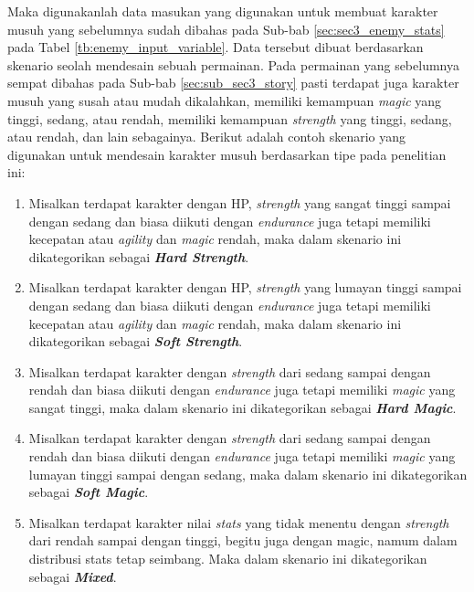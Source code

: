 Maka digunakanlah data masukan yang digunakan untuk membuat karakter musuh yang sebelumnya sudah dibahas pada Sub-bab \ref{sec:sec3_enemy_stats} pada Tabel \ref{tb:enemy_input_variable}. Data tersebut dibuat berdasarkan skenario seolah mendesain sebuah permainan. Pada permainan yang sebelumnya sempat dibahas pada Sub-bab \ref{sec:sub_sec3_story} pasti terdapat juga karakter musuh yang susah atau mudah dikalahkan, memiliki kemampuan \textit{magic} yang tinggi, sedang, atau rendah, memiliki kemampuan \textit{strength} yang tinggi, sedang, atau rendah, dan lain sebagainya. Berikut adalah contoh skenario yang digunakan untuk mendesain karakter musuh berdasarkan tipe pada penelitian ini:

\begin{enumerate}[label=\arabic*).]
	\item Misalkan terdapat karakter dengan HP, \textit{strength} yang sangat tinggi sampai dengan sedang dan biasa diikuti dengan \textit{endurance} juga tetapi memiliki kecepatan atau \textit{agility} dan \textit{magic} rendah, maka dalam skenario ini dikategorikan sebagai \textbf{\textit{Hard Strength}}. 
	
	\item Misalkan terdapat karakter dengan HP, \textit{strength} yang lumayan tinggi sampai dengan sedang dan biasa diikuti dengan \textit{endurance} juga tetapi memiliki kecepatan atau \textit{agility} dan \textit{magic} rendah, maka dalam skenario ini dikategorikan sebagai \textbf{\textit{Soft Strength}}.
	
	\item Misalkan terdapat karakter dengan \textit{strength} dari sedang sampai dengan rendah dan biasa diikuti dengan \textit{endurance} juga tetapi memiliki \textit{magic} yang sangat tinggi, maka dalam skenario ini dikategorikan sebagai \textbf{\textit{Hard Magic}}.
	
	\item Misalkan terdapat karakter dengan \textit{strength} dari sedang sampai dengan rendah dan biasa diikuti dengan \textit{endurance} juga tetapi memiliki \textit{magic} yang lumayan tinggi sampai dengan sedang, maka dalam skenario ini dikategorikan sebagai \textbf{\textit{Soft Magic}}.
	
	\item Misalkan terdapat karakter nilai \textit{stats} yang tidak menentu dengan \textit{strength} dari rendah sampai dengan tinggi, begitu juga dengan magic, namum dalam distribusi stats tetap seimbang. Maka dalam skenario ini dikategorikan sebagai \textbf{\textit{Mixed}}.
\end{enumerate}

